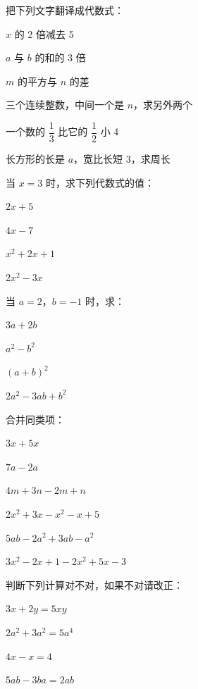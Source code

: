 \begin{exercise}
\item 把下列文字翻译成代数式：
  \begin{subexercise}
    \item $x$ 的 2 倍减去 5
    \item $a$ 与 $b$ 的和的 3 倍
    \item $m$ 的平方与 $n$ 的差
    \item 三个连续整数，中间一个是 $n$，求另外两个
    \item 一个数的 $\dfrac{1}{3}$ 比它的 $\dfrac{1}{2}$ 小 4
    \item 长方形的长是 $a$，宽比长短 3，求周长
  \end{subexercise}

\item 当 $x=3$ 时，求下列代数式的值：
  \begin{subexercise}
    \item $2x + 5$
    \item $4x - 7$
    \item $x^2 + 2x + 1$
    \item $2x^2 - 3x$
  \end{subexercise}

\item 当 $a=2$，$b=-1$ 时，求：
  \begin{subexercise}
    \item $3a + 2b$
    \item $a^2 - b^2$
    \item $(a+b)^2$
    \item $2a^2 - 3ab + b^2$
  \end{subexercise}

\item 合并同类项：
  \begin{subexercise}
    \item $3x + 5x$
    \item $7a - 2a$
    \item $4m + 3n - 2m + n$
    \item $2x^2 + 3x - x^2 - x + 5$
    \item $5ab - 2a^2 + 3ab - a^2$
    \item $3x^2 - 2x + 1 - 2x^2 + 5x - 3$
  \end{subexercise}

\item 判断下列计算对不对，如果不对请改正：
  \begin{subexercise}
    \item $3x + 2y = 5xy$
    \item $2a^2 + 3a^2 = 5a^4$
    \item $4x - x = 4$
    \item $5ab - 3ba = 2ab$
  \end{subexercise}
\end{exercise}

